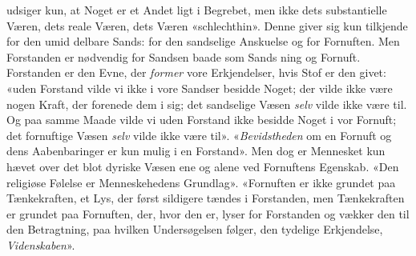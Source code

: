 \documentclass[12pt,a4paper]{book}
\begin{document}
udsiger kun, at Noget er et Andet ligt i Begrebet, men ikke
dets substantielle Væren, dets reale Væren, dets Væren
«schlechthin». Denne giver sig kun tilkjende for den umid\-%
delbare Sands: for den sandselige Anskuelse og for Fornuften.
Men Forstanden er nødvendig for Sandsen baade som Sands\-%
ning og Fornuft. Forstanden er den Evne, der \emph{former} vore
Erkjendelser, hvis Stof er den givet: «uden Forstand vilde vi
ikke i vore Sandser besidde Noget; der vilde ikke være nogen
Kraft, der forenede dem i sig; det sandselige Væsen \emph{selv} vilde
ikke være til. Og paa samme Maade vilde vi uden Forstand
ikke besidde Noget i vor Fornuft; det fornuftige Væsen \emph{selv}
vilde ikke være til». «\emph{Bevidstheden} om en Fornuft og
dens Aabenbaringer er kun mulig i en Forstand». Men dog
er Mennesket kun hævet over det blot dyriske Væsen ene og
alene ved Fornuftens Egenskab. «Den religiøse Følelse er
Menneskehedens Grundlag». «Fornuften er ikke grundet paa
Tænkekraften, et Lys, der først sildigere tændes i Forstanden,
men Tænkekraften er grundet paa Fornuften, der, hvor den
er, lyser for Forstanden og vækker den til den Betragtning,
paa hvilken Undersøgelsen følger, den tydelige Erkjendelse,
\emph{Videnskaben}».
\end{document}
